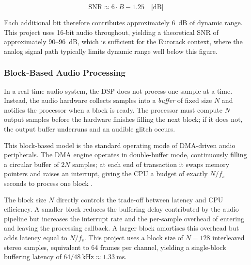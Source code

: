 \begin{equation}
\mathrm{SNR} \approx 6 \cdot B - 1.25 \quad \text{[dB]}
\end{equation}

Each additional bit therefore contributes approximately \qty{6}{dB} of dynamic range. 
This project uses 16-bit audio throughout, yielding a theoretical SNR of approximately 90--\qty{96}{dB}, which is sufficient for the Eurorack context, where the analog signal path typically limits dynamic range well below this figure.

\subsubsection{Block-Based Audio Processing}

In a real-time audio system, the DSP does not process one sample at a time.
Instead, the audio hardware collects samples into a \textit{buffer} of fixed size $N$
and notifies the processor when a block is ready.
The processor must compute $N$ output samples before the hardware finishes filling the
next block; if it does not, the output buffer underruns and an audible glitch occurs.

This block-based model is the standard operating mode of \ac{DMA}-driven audio peripherals.
The DMA engine operates in double-buffer mode, continuously filling a circular buffer of $2N$ samples; at each end of transaction it swaps memory pointers and raises an interrupt, giving the CPU a budget of exactly $N / f_s$ seconds to process one block \cite[Section~15.3.11]{stmicroelectronicsRM0433ReferenceManual2023}.

The block size $N$ directly controls the trade-off between latency and CPU efficiency.
A smaller block reduces the buffering delay contributed by the audio pipeline but increases the interrupt rate and the per-sample overhead of entering and leaving the processing callback.
A larger block amortises this overhead but adds latency equal to $N / f_s$. 
This project uses a block size of $N = 128$ interleaved stereo samples, equivalent to 64 frames per channel, yielding a single-block buffering latency of $64 / \qty{48}{\kilo\hertz} \approx \qty{1.33}{\milli\second}$.
